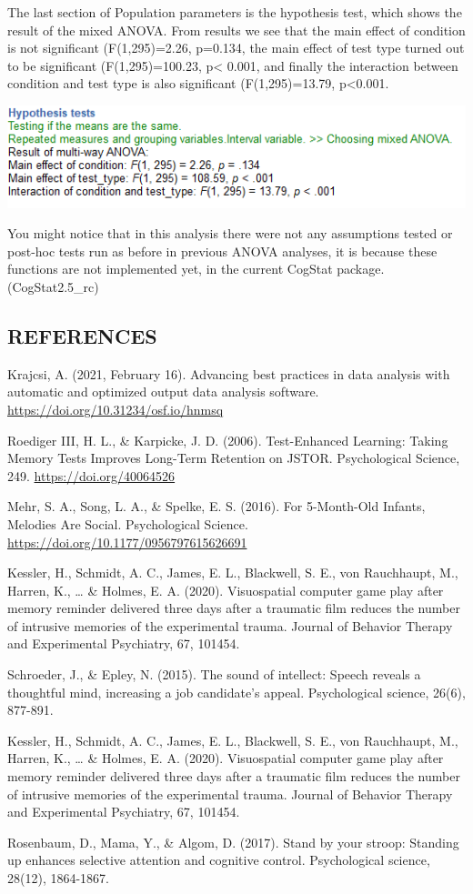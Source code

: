 \documentclass[
]{book}
\begin{document}
The last section of Population parameters is the hypothesis test, which shows the result of the mixed ANOVA. From results we see that the main effect of condition is not significant (F(1,295)=2.26, p=0.134, the main effect of test type turned out to be significant (F(1,295)=100.23, p\textless{} 0.001, and finally the interaction between condition and test type is also significant (F(1,295)=13.79, p\textless0.001.

\includegraphics{img/ch11/11.3CRMVG_hyptest.png}

You might notice that in this analysis there were not any assumptions tested or post-hoc tests run as before in previous ANOVA analyses, it is because these functions are not implemented yet, in the current CogStat package. (CogStat2.5\_rc)

\hypertarget{references}{%
\subsection{REFERENCES}\label{references}}

Krajcsi, A. (2021, February 16). Advancing best practices in data analysis with automatic and optimized output data analysis software. \url{https://doi.org/10.31234/osf.io/hnmsq}

Roediger III, H. L., \& Karpicke, J. D. (2006). Test-Enhanced Learning: Taking Memory Tests Improves Long-Term Retention on JSTOR. Psychological Science, 249. \url{https://doi.org/40064526}

Mehr, S. A., Song, L. A., \& Spelke, E. S. (2016). For 5-Month-Old Infants, Melodies Are Social. Psychological Science. \url{https://doi.org/10.1177/0956797615626691}

Kessler, H., Schmidt, A. C., James, E. L., Blackwell, S. E., von Rauchhaupt, M., Harren, K., \ldots{} \& Holmes, E. A. (2020). Visuospatial computer game play after memory reminder delivered three days after a traumatic film reduces the number of intrusive memories of the experimental trauma. Journal of Behavior Therapy and Experimental Psychiatry, 67, 101454.

Schroeder, J., \& Epley, N. (2015). The sound of intellect: Speech reveals a thoughtful mind, increasing a job candidate's appeal. Psychological science, 26(6), 877-891.

Kessler, H., Schmidt, A. C., James, E. L., Blackwell, S. E., von Rauchhaupt, M., Harren, K., \ldots{} \& Holmes, E. A. (2020). Visuospatial computer game play after memory reminder delivered three days after a traumatic film reduces the number of intrusive memories of the experimental trauma. Journal of Behavior Therapy and Experimental Psychiatry, 67, 101454.

Rosenbaum, D., Mama, Y., \& Algom, D. (2017). Stand by your stroop: Standing up enhances selective attention and cognitive control. Psychological science, 28(12), 1864-1867.

  
\end{document}
